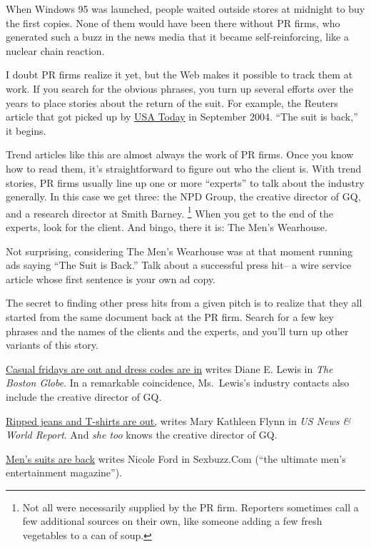 When Windows 95 was launched, people waited outside stores at midnight
to buy the first copies. None of them would have been there without PR
firms, who generated such a buzz in the news media that it became
self-reinforcing, like a nuclear chain reaction.

I doubt PR firms realize it yet, but the Web makes it possible to track
them at work. If you search for the obvious phrases, you turn up several
efforts over the years to place stories about the return of the suit.
For example, the Reuters article that got picked up by
\href{http://www.usatoday.com/money/industries/retail/2004-09-01-suits_x.htm}{USA
Today} in September 2004. ``The suit is back,'' it begins.

Trend articles like this are almost always the work of PR firms. Once
you know how to read them, it's straightforward to figure out who the
client is. With trend stories, PR firms usually line up one or more
``experts'' to talk about the industry generally. In this case we get
three: the NPD Group, the creative director of GQ, and a research
director at Smith Barney. \footnote{Not all were necessarily supplied by the PR firm. Reporters
sometimes call a few additional sources on their own, like someone
adding a few fresh vegetables to a can of soup.} When you get to the
end of the experts, look for the client. And bingo, there it is: The
Men's Wearhouse.

Not surprising, considering The Men's Wearhouse was at that moment
running ads saying ``The Suit is Back.'' Talk about a successful press
hit-- a wire service article whose first sentence is your own ad copy.

The secret to finding other press hits from a given pitch is to realize
that they all started from the same document back at the PR firm. Search
for a few key phrases and the names of the clients and the experts, and
you'll turn up other variants of this story.

\href{http://bostonworks.boston.com/globe/articles/091904_suit.html}{Casual
fridays are out and dress codes are in} writes Diane E. Lewis in
\emph{The Boston Globe}. In a remarkable coincidence, Ms.~Lewis's
industry contacts also include the creative director of GQ.

\href{http://www.usnews.com/usnews/biztech/articles/041108/8eedress.htm}{Ripped
jeans and T-shirts are out,} writes Mary Kathleen Flynn in \emph{US News
\& World Report}. And \emph{she too} knows the creative director of GQ.

\href{http://www.sexbuzz.com/style/9,0004,00.shtml}{Men's suits are
back} writes Nicole Ford in Sexbuzz.Com (``the ultimate men's
entertainment magazine'').

